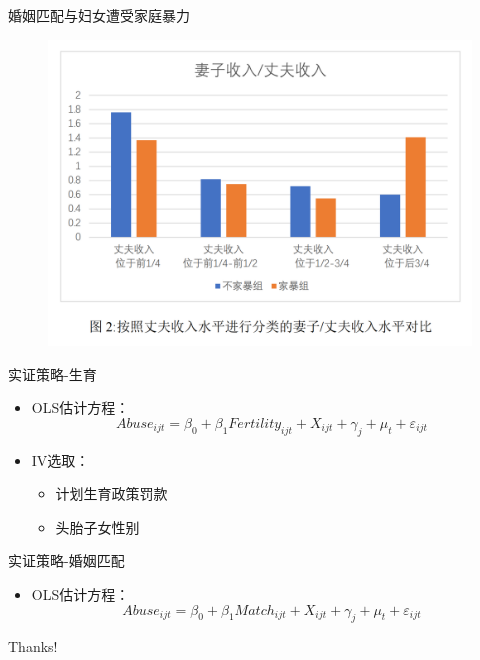 \documentclass{beamer}
\begin{document}
\begin{frame}{婚姻匹配与妇女遭受家庭暴力}
    \begin{figure}
        \includegraphics[scale=0.35]{3.png}
    \end{figure}
\end{frame}

\begin{frame}{实证策略-生育}
    \begin{itemize}[<+-| alert@+>] 
        \item OLS估计方程：\\
        \begin{equation}
            Abuse_{ijt}=β_0+β_1 Fertility_{ijt}+X_{ijt}+γ_j+μ_t+ε_{ijt}
        \end{equation}
        \item IV选取：
        \begin{itemize}
            \item 计划生育政策罚款
            \item 头胎子女性别
        \end{itemize}
    \end{itemize}
\end{frame}

\begin{frame}{实证策略-婚姻匹配}
    \begin{itemize}
        \item OLS估计方程：\\
        \begin{equation}
            Abuse_{ijt}=\beta_0+\beta_1 Match_{ijt}+X_{ijt}+γ_j+μ_t+ε_{ijt}
        \end{equation}
    \end{itemize}
\end{frame}

\begin{frame}
    \begin{center}
        {\Huge\calligra Thanks!}
    \end{center}
\end{frame}
\end{document}
